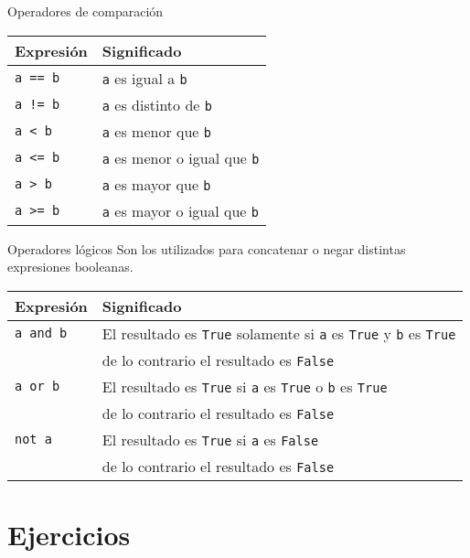 \begin{referencia_python}
\begin{sintaxis}{Operadores de comparación}
\begin{tabular}[c]{|l|l|}
\hline {\bf Expresión} & {\bf Significado}\\
\hline \hline
\lstinline!a == b!& \lstinline!a! es igual a \lstinline!b! \\\hline
\lstinline+a != b+& \lstinline!a! es distinto de \lstinline!b! \\\hline
\lstinline!a < b!& \lstinline!a! es menor que \lstinline!b! \\\hline
\lstinline!a <= b!& \lstinline!a! es menor o igual que \lstinline!b! \\\hline
\lstinline!a > b!& \lstinline!a! es mayor que \lstinline!b! \\\hline
\lstinline!a >= b!& \lstinline!a! es mayor o igual que \lstinline!b! \\\hline
\end{tabular}
\end{sintaxis}

\begin{sintaxis}{Operadores lógicos}
Son los utilizados para concatenar o negar distintas expresiones booleanas.

\begin{tabular}[c]{|l|l|}
\hline {\bf Expresión} & {\bf Significado}\\
\hline \hline
\lstinline!a and b!& El resultado es \lstinline!True! solamente si
\lstinline!a! es \lstinline!True! y  \lstinline!b! es \lstinline!True! \\
& de lo contrario el resultado es \lstinline!False!\\\hline
\lstinline!a or b!& El resultado es \lstinline!True! si \lstinline!a! es
\lstinline!True! o  \lstinline!b! es \lstinline!True! \\
& de lo contrario el resultado es \lstinline!False!\\\hline
\lstinline!not a!& El resultado es \lstinline!True! si \lstinline!a! es
\lstinline!False!\\
& de lo contrario el resultado es \lstinline!False!\\\hline
\end{tabular}
\end{sintaxis}

\end{referencia_python}


\newpage
\section{Ejercicios}

